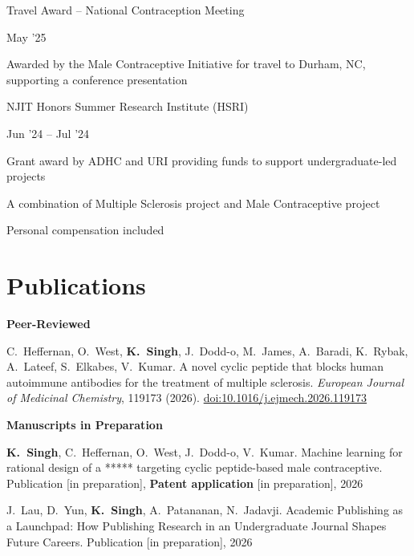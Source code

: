 \documentclass[10pt,a4paper]{article}
\newlength{\entrygap}\setlength{\entrygap}{5pt}
\newcommand{\entry}[2]{%
  \par\vspace{\entrygap}%
  \noindent
  \begin{minipage}[t]{0.795\textwidth}\raggedright #1\end{minipage}%
  \hfill
  \begin{minipage}[t]{0.19\textwidth}\raggedleft\small #2\end{minipage}%
  \par\penalty500
}
\begin{document}
\entry{Travel Award -- National Contraception Meeting}{May '25}
\begin{cvitems}
  \item Awarded by the Male Contraceptive Initiative for travel to Durham, NC, supporting a conference presentation
\end{cvitems}

\entry{NJIT Honors Summer Research Institute (HSRI)}{Jun '24 -- Jul '24}
\begin{cvitems}
  \item Grant award by ADHC and URI providing funds to support undergraduate-led projects
  \item A combination of Multiple Sclerosis project and Male Contraceptive project
  \item Personal compensation included
\end{cvitems}


\section{Publications}

\vspace{4pt}
\textbf{Peer-Reviewed}
\begin{cvitems}
  \item C.~Heffernan, O.~West, \textbf{K.~Singh}, J.~Dodd-o, M.~James, A.~Baradi, K.~Rybak, A.~Lateef, S.~Elkabes, V.~Kumar. A novel cyclic peptide that blocks human autoimmune antibodies for the treatment of multiple sclerosis. \textit{European Journal of Medicinal Chemistry}, 119173 (2026). \href{https://doi.org/10.1016/j.ejmech.2026.119173}{doi:10.1016/j.ejmech.2026.119173}
\end{cvitems}

\vspace{6pt}
\textbf{Manuscripts in Preparation}
\begin{cvitems}
  \item \textbf{K.~Singh}, C.~Heffernan, O.~West, J.~Dodd-o, V.~Kumar. Machine learning for rational design of a ***** targeting cyclic peptide-based male contraceptive. Publication [in preparation],  \textbf{Patent application} [in preparation], 2026
  \item J.~Lau, D.~Yun, \textbf{K.~Singh}, A.~Patananan, N.~Jadavji. Academic Publishing as a Launchpad: How Publishing Research in an Undergraduate Journal Shapes Future Careers. Publication [in preparation], 2026
\end{cvitems}
\end{document}
